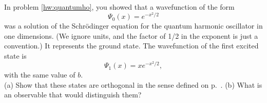 In problem \ref{hw:quantumho}, you showed that a wavefunction of the form
\begin{equation*}
\Psi_0(x)=e^{-x^2/2}
\end{equation*}
was a solution of the Schr\"{o}dinger equation for the quantum harmonic oscillator in
one dimensions. (We ignore units, and the factor of 1/2 in the exponent is just a convention.)
It represents the ground state. The wavefunction of the first
excited state is
\begin{equation*}
\Psi_1(x)=xe^{-x^2/2},
\end{equation*}
with the same value of $b$.\\
(a) Show that these states are orthogonal in the sense defined 
on p.~\pageref{orthogonal-wavefunctions}.\hwendpart
(b) What is an observable that would distinguish them?
